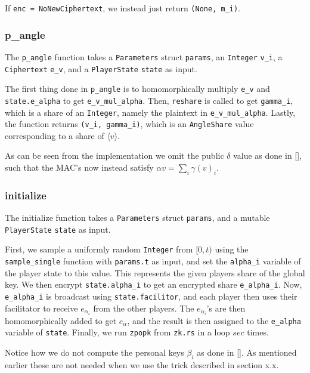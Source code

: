 \documentclass[../main.tex]{subfiles}
\begin{document}
If \lstinline{enc = NoNewCiphertext}, we instead just return \lstinline{(None, m_i)}.

\subsubsection{p\_angle}
The \lstinline{p_angle} function takes a \lstinline{Parameters} struct \lstinline{params}, an \lstinline{Integer} \lstinline{v_i}, a \lstinline{Ciphertext} \lstinline{e_v}, and a \lstinline{PlayerState} \lstinline{state} as input.

The first thing done in \lstinline{p_angle} is to homomorphically multiply \lstinline{e_v} and \lstinline{state.e_alpha} to get \lstinline{e_v_mul_alpha}. Then, \lstinline{reshare} is called to get \lstinline{gamma_i}, which is a share of an \lstinline{Integer}, namely the plaintext in \lstinline{e_v_mul_alpha}. Lastly, the function returns \lstinline{(v_i, gamma_i)}, which is an \lstinline{AngleShare} value corresponding to a share of $\langle v \rangle$.

As can be seen from the implementation we omit the public $\delta$ value as done in [], such that the MAC's now instead satisfy $\alpha v = \sum_i \gamma(v)_i$.
 
\subsubsection{initialize}
The initialize function takes a \lstinline{Parameters} struct \lstinline{params}, and a mutable \lstinline{PlayerState} \lstinline{state} as input.

First, we sample a uniformly random \lstinline{Integer} from $[0, t)$ using the \lstinline{sample_single} function with \lstinline{params.t} as input, and set the \lstinline{alpha_i} variable of the player state to this value. This represents the given players share of the global key. We then encrypt \lstinline{state.alpha_i} to get an encrypted share \lstinline{e_alpha_i}. Now, \lstinline{e_alpha_i} is broadcast using \lstinline{state.facilitor}, and each player then uses their facilitator to receive $e_{\alpha_i}$ from the other players. The $e_{\alpha_i}$'s are then homomorphically added to get $e_\alpha$, and the result is then assigned to the \lstinline{e_alpha} variable of \lstinline{state}. %
Finally, we run \lstinline{zpopk} from \lstinline{zk.rs} in a loop $sec$ times.

Notice how we do not compute the personal keys $\beta_i$ as done in []. As mentioned earlier these are not needed when we use the trick described in section x.x.
\end{document}
